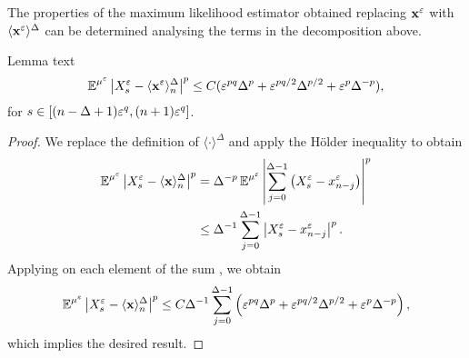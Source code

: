 \documentclass[10pt]{article}
\begin{document}
The properties of the maximum likelihood estimator obtained replacing $\mathbf x^\varepsilon$ with $\langle \mathbf x^\varepsilon \rangle^\Delta$ can be determined analysing the terms in the decomposition above. 
\begin{lemma}\label{lem:BoundDiff} Lemma text
	\begin{equation}
		\operatorname{\mathbb{E}}^{\mu^\varepsilon}\left\lvert X_s^\varepsilon - \langle \mathbf x^\varepsilon \rangle^\Delta_n\right\rvert^p \leq C(\varepsilon^{pq}\Delta^p + \varepsilon^{pq/2}\Delta^{p/2} + \varepsilon^p\Delta^{-p}),
	\end{equation}
	for $s \in [(n-\Delta+1)\varepsilon^q, (n+1)\varepsilon^q]$.
\end{lemma}
\begin{proof} We replace the definition of $\langle \cdot \rangle^\Delta$ and apply the Hölder inequality to obtain
	\begin{equation}
	\begin{aligned}
		\operatorname{\mathbb{E}}^{\mu^\varepsilon}\left\lvert X_s^\varepsilon - \langle \mathbf x \rangle^\Delta_{n}\right\rvert^p &= \Delta^{-p} \operatorname{\mathbb{E}}^{\mu^\varepsilon} \left\lvert\sum_{j=0}^{\Delta-1}\left(X_s^\varepsilon - x^\varepsilon_{n-j}\right)\right\rvert^p \\
		&\leq \Delta^{-1}\sum_{j=0}^{\Delta-1} \left\lvert X_s^\varepsilon - x^\varepsilon_{n-j}\right\rvert^p.
	\end{aligned}
	\end{equation}
	Applying on each element of the sum \cite[Lemma 6.1]{PaS07}, we obtain
	\begin{equation}
		\operatorname{\mathbb{E}}^{\mu^\varepsilon}\left\lvert X_s^\varepsilon - \langle \mathbf x \rangle^\Delta_{n}\right\rvert^p \leq C \Delta^{-1} \sum_{j=0}^{\Delta-1} \left(\varepsilon^{pq}\Delta^p + \varepsilon^{pq/2}\Delta^{p/2} + \varepsilon^p\Delta^{-p}\right),
	\end{equation}
	which implies the desired result.
\end{proof}
\end{document}
